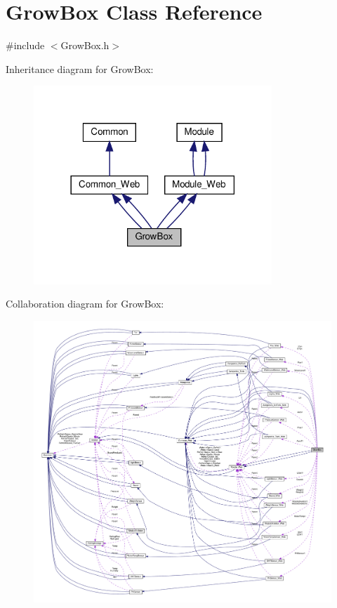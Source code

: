 \hypertarget{class_grow_box}{}\section{Grow\+Box Class Reference}
\label{class_grow_box}


{\ttfamily \#include $<$Grow\+Box.\+h$>$}



Inheritance diagram for Grow\+Box\+:
\nopagebreak
\begin{figure}[H]
\begin{center}
\leavevmode
\includegraphics[width=254pt]{class_grow_box__inherit__graph}
\end{center}
\end{figure}


Collaboration diagram for Grow\+Box\+:
\nopagebreak
\begin{figure}[H]
\begin{center}
\leavevmode
\includegraphics[width=350pt]{class_grow_box__coll__graph}
\end{center}
\end{figure}
